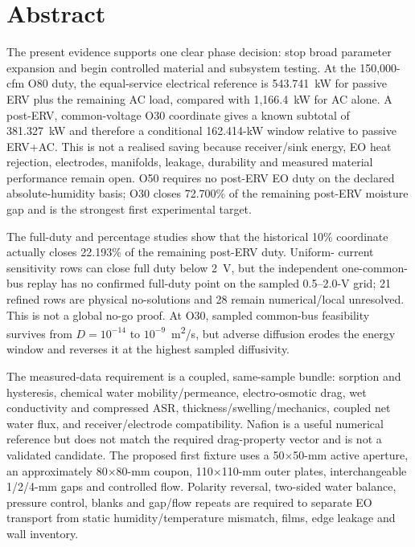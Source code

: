 \documentclass[10pt,a4paper]{article}
\begin{document}
\clearpage
{}
\section*{Abstract}

The present evidence supports one clear phase decision: stop broad parameter
expansion and begin controlled material and subsystem testing. At the
150,000-cfm O80 duty, the equal-service electrical reference is
543.741~kW for passive ERV plus the remaining AC load, compared with
1,166.4~kW for AC alone. A post-ERV, common-voltage O30 coordinate gives a
known subtotal of 381.327~kW and therefore a conditional 162.414-kW window
relative to passive ERV+AC. This is not a realised saving because receiver/sink
energy, EO heat rejection, electrodes, manifolds, leakage, durability and
measured material performance remain open. O50 requires no post-ERV EO duty
on the declared absolute-humidity basis; O30 closes 72.700\% of the remaining
post-ERV moisture gap and is the strongest first experimental target.

The full-duty and percentage studies show that the historical 10\%
coordinate actually closes 22.193\% of the remaining post-ERV duty. Uniform-
current sensitivity rows can close full duty below 2~V, but the independent
one-common-bus replay has no confirmed full-duty point on the sampled
0.5--2.0-V grid; 21 refined rows are physical no-solutions and 28 remain
numerical/local unresolved. This is not a global no-go proof. At O30,
sampled common-bus feasibility survives from $D=10^{-14}$ to
$10^{-9}$~m\textsuperscript{2}/s, but adverse diffusion erodes the energy
window and reverses it at the highest sampled diffusivity.

The measured-data requirement is a coupled, same-sample bundle: sorption and
hysteresis, chemical water mobility/permeance, electro-osmotic drag, wet
conductivity and compressed ASR, thickness/swelling/mechanics, coupled net
water flux, and receiver/electrode compatibility. Nafion is a useful numerical
reference but does not match the required drag-property vector and is not a
validated candidate. The proposed first fixture uses a 50$\times$50-mm active
aperture, an approximately 80$\times$80-mm coupon, 110$\times$110-mm outer
plates, interchangeable 1/2/4-mm gaps and controlled flow. Polarity reversal,
two-sided water balance, pressure control, blanks and gap/flow repeats are
required to separate EO transport from static humidity/temperature mismatch,
films, edge leakage and wall inventory.
\end{document}
